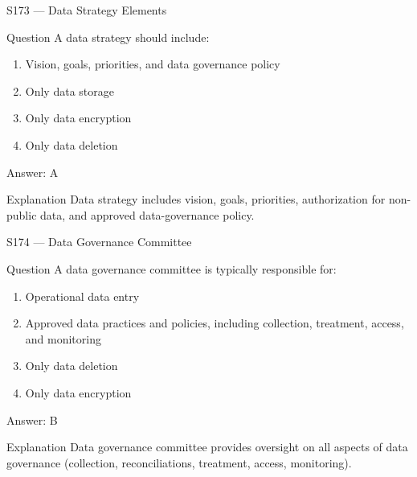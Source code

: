 \documentclass[aspectratio=169,8pt]{beamer}
\begin{document}
	\begin{frame}{S173 --- Data Strategy Elements}
		\begin{block}{Question}
			A data strategy should include:
			\begin{enumerate}
				\item Vision, goals, priorities, and data governance policy
				\item Only data storage
				\item Only data encryption
				\item Only data deletion
			\end{enumerate}
		\end{block}
		\begin{exampleblock}{Answer: A}\end{exampleblock}
		\begin{block}{Explanation}
			Data strategy includes vision, goals, priorities, authorization for non-public data, and approved data-governance policy.
		\end{block}
	\end{frame}
	
	\begin{frame}{S174 --- Data Governance Committee}
		\begin{block}{Question}
			A data governance committee is typically responsible for:
			\begin{enumerate}
				\item Operational data entry
				\item Approved data practices and policies, including collection, treatment, access, and monitoring
				\item Only data deletion
				\item Only data encryption
			\end{enumerate}
		\end{block}
		\begin{exampleblock}{Answer: B}\end{exampleblock}
		\begin{block}{Explanation}
			Data governance committee provides oversight on all aspects of data governance (collection, reconciliations, treatment, access, monitoring).
		\end{block}
	\end{frame}
	
\end{document}
